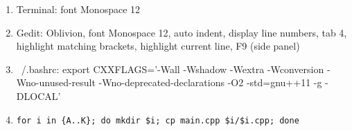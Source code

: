 \begin{enumerate}
    \item
	Terminal: font Monospace 12
	
	\item
	Gedit: Oblivion, font Monospace 12, auto indent, display line numbers, tab 4, highlight matching brackets, highlight current line, F9 (side panel)
	
	\item
	~/.bashrc: export CXXFLAGS='-Wall -Wshadow -Wextra -Wconversion -Wno-unused-result -Wno-deprecated-declarations -O2 -std=gnu++11 -g -DLOCAL'
	\item
\begin{verbatim}
for i in {A..K}; do mkdir $i; cp main.cpp $i/$i.cpp; done
\end{verbatim}

\end{enumerate}
